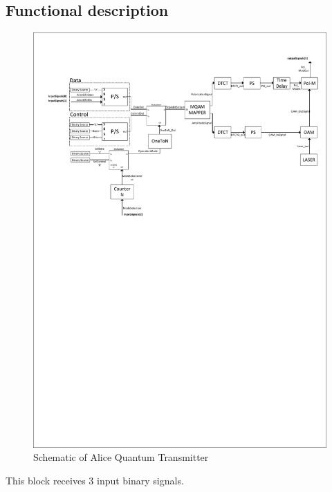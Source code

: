 \subsection*{Functional description}

\begin{figure}[h]
	\centering
	\includegraphics[clip, trim=0.5cm 15.0cm 0.5cm 0.1cm, width=1.0\textwidth]{./lib/AliceQuantumTx/figures/AliceQTx_diagram.pdf}
	\caption{Schematic of Alice Quantum Transmitter}\label{aliceQuantumTxDiagram}
\end{figure}

This block receives 3 input binary signals.

